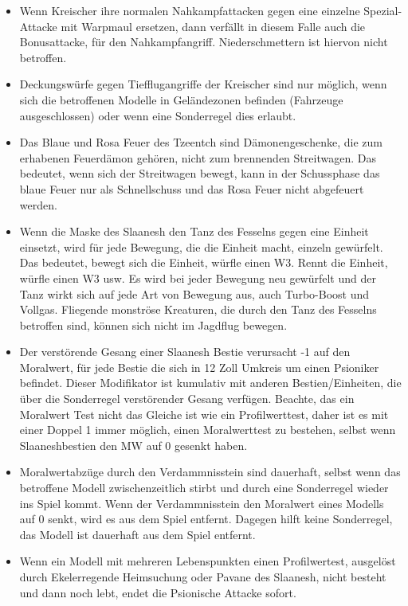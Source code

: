 \begin{itemize}
 \item Wenn Kreischer ihre normalen Nahkampfattacken gegen eine einzelne
  Spezial-Attacke mit Warpmaul ersetzen, dann verfällt in diesem Falle auch die
  Bonusattacke, für den Nahkampfangriff. Niederschmettern ist hiervon nicht
  betroffen.

 \item Deckungswürfe gegen Tiefflugangriffe der Kreischer sind nur möglich, wenn
  sich die betroffenen Modelle in Geländezonen befinden (Fahrzeuge
  ausgeschlossen) oder wenn eine Sonderregel dies erlaubt.

 \item Das Blaue und Rosa Feuer des Tzeentch sind Dämonengeschenke, die zum
  erhabenen Feuerdämon gehören, nicht zum brennenden Streitwagen. Das bedeutet,
  wenn sich der Streitwagen bewegt, kann in der Schussphase das blaue Feuer nur
  als Schnellschuss und das Rosa Feuer nicht abgefeuert werden.

 \item Wenn die Maske des Slaanesh den Tanz des Fesselns gegen eine Einheit
  einsetzt, wird für jede Bewegung, die die Einheit macht, einzeln gewürfelt.
  Das bedeutet, bewegt sich die Einheit, würfle einen W3. Rennt die Einheit,
  würfle einen W3 usw. Es wird bei jeder Bewegung neu gewürfelt und der Tanz
  wirkt sich auf jede Art von Bewegung aus, auch Turbo-Boost und Vollgas.
  Fliegende monströse Kreaturen, die durch den Tanz des Fesselns betroffen sind,
  können sich nicht im Jagdflug bewegen.

 \item Der verstörende Gesang einer Slaanesh Bestie verursacht -1 auf den
  Moralwert, für jede Bestie die sich in 12 Zoll Umkreis um einen Psioniker
  befindet. Dieser Modifikator ist kumulativ mit anderen Bestien/Einheiten, die
  über die Sonderregel verstörender Gesang verfügen. Beachte, das ein Moralwert
  Test nicht das Gleiche ist wie ein Profilwerttest, daher ist es mit einer
  Doppel 1 immer möglich, einen Moralwerttest zu bestehen, selbst wenn
  Slaaneshbestien den MW auf 0 gesenkt haben.

 \item
Moralwertabzüge durch den Verdammnisstein sind dauerhaft, selbst wenn das
betroffene Modell zwischenzeitlich stirbt und durch eine Sonderregel wieder ins
Spiel kommt. Wenn der Verdammnisstein den Moralwert eines Modells auf 0 senkt,
wird es aus dem Spiel entfernt. Dagegen hilft keine Sonderregel, das Modell ist
dauerhaft aus dem Spiel entfernt.

 \item Wenn ein Modell mit mehreren Lebenspunkten einen Profilwertest, ausgelöst
  durch Ekelerregende Heimsuchung oder Pavane des Slaanesh, nicht besteht und
  dann noch lebt, endet die Psionische Attacke sofort.


\end{itemize}
